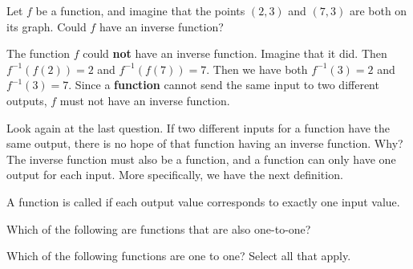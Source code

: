 \documentclass{ximera}
\begin{document}
\begin{question}
  Let $f$ be a function, and imagine that the points $(2,3)$ and
  $(7,3)$ are both on its graph.  Could $f$ have an inverse function?
  \begin{multipleChoice}
  \end{multipleChoice}
  \begin{feedback}
    The function $f$ could \textbf{not} have an inverse function.
    Imagine that it did.  Then $f^{-1}(f(2)) = 2$ and $f^{-1}(f(7)) =
    7$.  Then we have both $f^{-1}(3) = 2$ and $f^{-1}(3) = 7$.  Since
    a \textbf{function} cannot send the same input to two different
    outputs, $f$ must not have an inverse function.
  \end{feedback}
\end{question}


Look again at the last question.  If two different inputs for a
function have the same output, there is no hope of that function
having an inverse function.  Why?  The inverse function must also be a
function, and a function can only have one output for each input.
More specifically, we have the next definition.

\begin{definition}
A function is called  if each output value corresponds
to exactly one input value.
\end{definition}

\begin{question}
  Which of the following are functions that are also one-to-one?
  \begin{selectAll}
  \end{selectAll}
\end{question}

\begin{question}
Which of the following functions are one to one?  Select all that
apply.
\begin{selectAll}
\end{selectAll}
\end{question}
\end{document}
